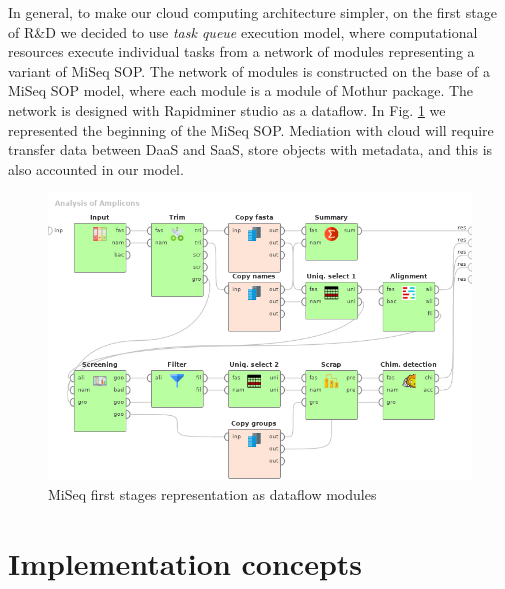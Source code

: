 \documentclass[a4paper]{jpconf}
\begin{document}
In general, to make our cloud computing architecture simpler, on the first stage of R\&D we decided to use \emph{task queue} execution model, where computational resources execute individual tasks from a network of modules representing a variant of MiSeq SOP.  The network of modules is constructed on the base of a MiSeq SOP model, where each module is a module of Mothur package.  The network is designed with Rapidminer studio as a dataflow. In Fig. \ref{fig:mothur} we represented the beginning of the MiSeq SOP.  Mediation with cloud will require transfer data between DaaS and SaaS, store objects with metadata, and this is also accounted in our model.



\begin{figure}[bt]
  \centering
   \includegraphics[width=0.7\linewidth]{Dataflow-color-en.png}
  \caption{MiSeq first stages representation as dataflow modules \cite{cherk19}}
  \label{fig:mothur}
\end{figure}


\section{Implementation concepts}

\end{document}
